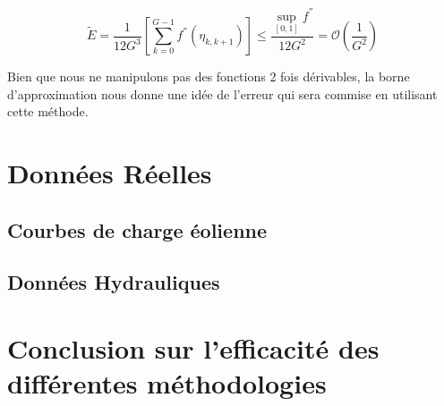 $$\tilde E = \frac 1 {12 G^3} \left[\sum_{k=0}^{G-1}f ^{''}(\eta_{k, k+1})\right] \leq \frac{\sup\limits_{[0,1]} f^{''} }{12 G^2}= \mathcal O\left( \frac 1 {G^2} \right)$$

Bien que nous ne manipulons pas des fonctions 2 fois dérivables, la borne d'approximation nous donne une idée de l'erreur qui sera commise en utilisant cette méthode.




\section{Données Réelles}

\subsection{Courbes de charge éolienne}

\subsection{Données Hydrauliques}

\section{Conclusion sur l'efficacité des différentes méthodologies}